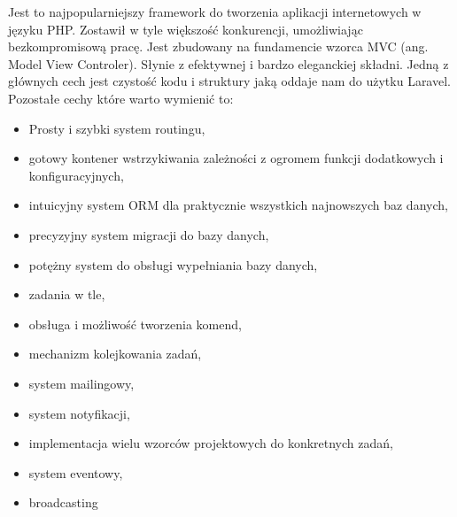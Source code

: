 Jest to najpopularniejszy framework do tworzenia aplikacji internetowych w języku PHP. Zostawił w tyle większość konkurencji, umożliwiając bezkompromisową pracę.  
Jest zbudowany na fundamencie wzorca MVC (ang. Model View Controler).  
Słynie z efektywnej i bardzo eleganckiej składni. Jedną z głównych cech jest czystość kodu i struktury jaką oddaje nam do użytku Laravel.
Pozostałe cechy które warto wymienić to: 

\begin{itemize}
    \item Prosty i szybki system routingu,
    \item gotowy kontener wstrzykiwania zależności z ogromem funkcji dodatkowych i konfiguracyjnych,
    \item intuicyjny system ORM dla praktycznie wszystkich najnowszych baz danych,
    \item precyzyjny system migracji do bazy danych,
    \item potężny system do obsługi wypełniania bazy danych,
    \item zadania w tle,
    \item obsługa i możliwość tworzenia komend,
    \item mechanizm kolejkowania zadań,
    \item system mailingowy,
    \item system notyfikacji,
    \item implementacja wielu wzorców projektowych do konkretnych zadań,
    \item system eventowy,
    \item broadcasting
  \end{itemize}